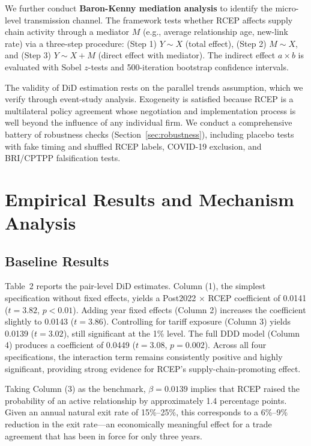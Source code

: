 \documentclass[preprint,12pt,authoryear]{elsarticle}
\begin{document}
We further conduct \textbf{Baron-Kenny mediation analysis} to identify the micro-level transmission channel. The framework tests whether RCEP affects supply chain activity through a mediator $M$ (e.g., average relationship age, new-link rate) via a three-step procedure: (Step 1) $Y \sim X$ (total effect), (Step 2) $M \sim X$, and (Step 3) $Y \sim X + M$ (direct effect with mediator). The indirect effect $a \times b$ is evaluated with Sobel $z$-tests and 500-iteration bootstrap confidence intervals.

The validity of DiD estimation rests on the parallel trends assumption, which we verify through event-study analysis. Exogeneity is satisfied because RCEP is a multilateral policy agreement whose negotiation and implementation process is well beyond the influence of any individual firm. We conduct a comprehensive battery of robustness checks (Section~\ref{sec:robustness}), including placebo tests with fake timing and shuffled RCEP labels, COVID-19 exclusion, and BRI/CPTPP falsification tests.

\section{Empirical Results and Mechanism Analysis}
\label{sec:results}

\subsection{Baseline Results}



Table~2 reports the pair-level DiD estimates. Column (1), the simplest specification without fixed effects, yields a Post2022 $\times$ RCEP coefficient of 0.0141 ($t=3.82$, $p<0.01$). Adding year fixed effects (Column 2) increases the coefficient slightly to 0.0143 ($t=3.86$). Controlling for tariff exposure (Column 3) yields 0.0139 ($t=3.02$), still significant at the 1\% level. The full DDD model (Column 4) produces a coefficient of 0.0449 ($t=3.08$, $p=0.002$). Across all four specifications, the interaction term remains consistently positive and highly significant, providing strong evidence for RCEP's supply-chain-promoting effect.

Taking Column (3) as the benchmark, $\beta=0.0139$ implies that RCEP raised the probability of an active relationship by approximately 1.4 percentage points. Given an annual natural exit rate of 15\%--25\%, this corresponds to a 6\%--9\% reduction in the exit rate—an economically meaningful effect for a trade agreement that has been in force for only three years.
\end{document}
